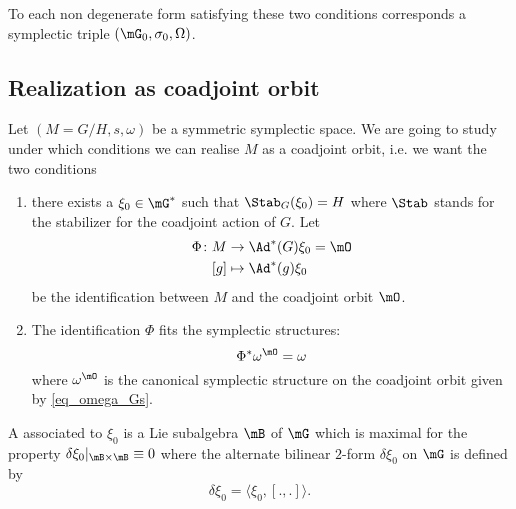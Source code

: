 To each non degenerate form satisfying these two conditions corresponds a symplectic triple $(\mG_0,\sigma_0,\Omega)$.

\subsection{Realization as coadjoint orbit}

Let $(M=G/H,s,\omega)$ be a symmetric symplectic space. We are going to study under which conditions we can realise $M$ as a coadjoint orbit, i.e. we want the two conditions
\begin{enumerate}

	\item
		there exists a $\xi_0\in\mG^*$ such that $\Stab_G(\xi_0)=H$ where $\Stab$ stands for the stabilizer for the coadjoint action of $G$. Let
		\begin{equation}
			\begin{aligned}
				\Phi\colon M&\to \Ad^*(G)\xi_0=\mO \\
				[g]&\mapsto \Ad^*(g)\xi_0
			\end{aligned}
		\end{equation}
		be the identification between $M$ and the coadjoint orbit $\mO$.
	\item
		The identification $\Phi$ fits the symplectic structures:
		\begin{equation}
			\Phi^*\omega^{\mO}=\omega
		\end{equation}
		where $\omega^{\mO}$ is the canonical symplectic structure on the coadjoint orbit given by \eqref{eq_omega_Gs}.
\end{enumerate}

\begin{definition}
	A  associated to $\xi_0$ is a Lie subalgebra $\mB$ of $\mG$ which is maximal for the property $\delta\xi_0|_{\mB\times \mB}\equiv 0$ where the alternate bilinear $2$-form $\delta\xi_0$ on $\mG$ is defined by
	\begin{equation}
		\delta\xi_0=\langle \xi_0, [.,.]\rangle.
	\end{equation}
\end{definition}

